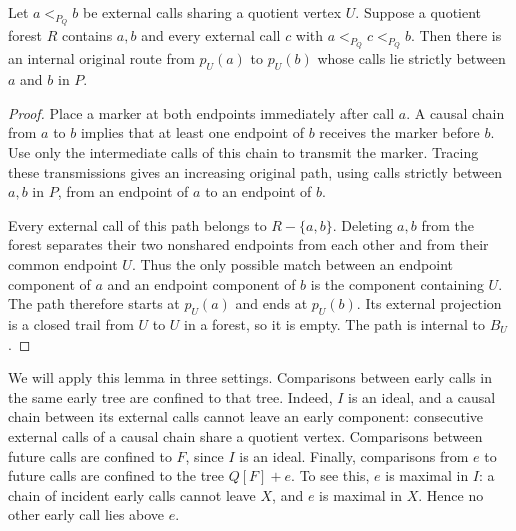 \documentclass[USenglish, a4paper, thm-restate,numberwithinsect, cleveref]{lipics-v2021}
\begin{document}
\begin{lemma}
\label{lem:characterization-forest-confinement}
Let $a<_{P_Q}b$ be external calls sharing a quotient vertex $U$.
Suppose a quotient forest $R$ contains $a,b$ and every external call
$c$ with $a<_{P_Q}c<_{P_Q}b$. Then there is an internal original
route from $p_U(a)$ to $p_U(b)$ whose calls lie strictly between
$a$ and $b$ in $P$.
\end{lemma}
\begin{proof}
Place a marker at both endpoints immediately after call $a$.
A causal chain from $a$ to $b$ implies that at least one endpoint of
$b$ receives the marker before $b$. Use only the intermediate calls
of this chain to transmit the marker. Tracing these transmissions gives
an increasing original path, using calls strictly between $a,b$ in $P$,
from an endpoint of $a$ to an endpoint of $b$.

Every external call of this path belongs to $R-\{a,b\}$. Deleting
$a,b$ from the forest separates their two nonshared endpoints from
each other and from their common endpoint $U$. Thus the only possible
match between an endpoint component of $a$ and an endpoint component
of $b$ is the component containing $U$. The path therefore starts at
$p_U(a)$ and ends at $p_U(b)$. Its external projection is a closed
trail from $U$ to $U$ in a forest, so it is empty. The path is internal
to $B_U$.
\end{proof}

We will apply this lemma in three settings. Comparisons between early
calls in the same early tree are confined to that tree. Indeed, $I$
is an ideal, and a causal chain between its external calls cannot
leave an early component: consecutive external calls of a causal
chain share a quotient vertex. Comparisons between future calls are
confined to $F$, since $I$ is an ideal. Finally, comparisons from $e$
to future calls are confined to the tree $Q[F]+e$. To see this, $e$ is
maximal in $I$: a chain of incident early calls cannot leave $X$,
and $e$ is maximal in $X$. Hence no other early call lies above $e$.
\end{document}
